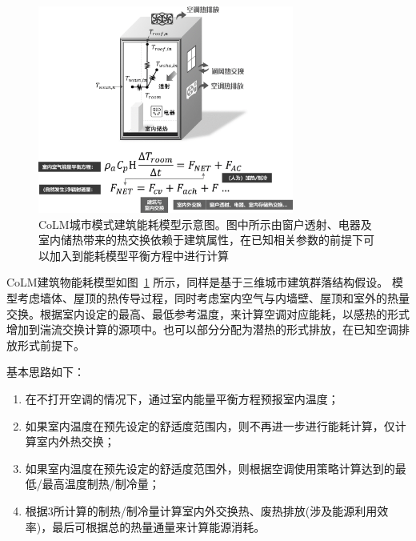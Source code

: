 {
\begin{figure}[htbp]
\centering
\includegraphics[width=0.75\textwidth]{Figures/城市模式/CoLM城市模式建筑能耗示意图.png}
\caption[CoLM城市模式建筑能耗模型示意图]{CoLM城市模式建筑能耗模型示意图。图中所示由窗户透射、电器及室内储热带来的热交换依赖于建筑属性，在已知相关参数的前提下可以加入到能耗模型平衡方程中进行计算}
\label{fig:建筑能耗模型示意图}
\end{figure}
}

CoLM建筑物能耗模型如图~\ref{fig:建筑能耗模型示意图} 所示，同样是基于三维城市建筑群落结构假设。
模型考虑墙体、屋顶的热传导过程，同时考虑室内空气与内墙壁、屋顶和室外的热量交换。根据室内设定的最高、最低参考温度，来计算空调对应能耗，以感热的形式增加到湍流交换计算的源项中。也可以部分分配为潜热的形式排放，在已知空调排放形式前提下。

基本思路如下：

\begin{enumerate}
    \item 在不打开空调的情况下，通过室内能量平衡方程预报室内温度；
    \item 如果室内温度在预先设定的舒适度范围内，则不再进一步进行能耗计算，仅计算室内外热交换；
    \item 如果室内温度在预先设定的舒适度范围外，则根据空调使用策略计算达到的最低/最高温度制热/制冷量；
    \item 根据3所计算的制热/制冷量计算室内外交换热、废热排放(涉及能源利用效率)，最后可根据总的热量通量来计算能源消耗。
\end{enumerate}


